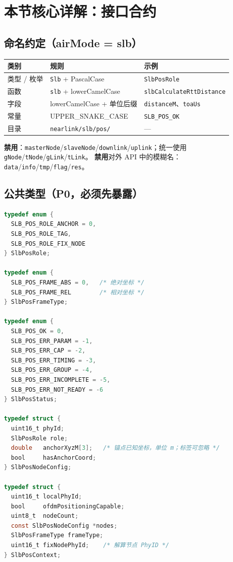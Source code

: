 \documentclass[11pt,a4paper]{ctexart}
\begin{document}
\section{本节核心详解：接口合约}

\subsection{命名约定（airMode = slb）}

\begin{table}[h]
\centering
\small
\begin{tabular}{lll}
\toprule
\textbf{类别} & \textbf{规则} & \textbf{示例} \\
\midrule
类型 / 枚举 & \texttt{Slb} + PascalCase & \texttt{SlbPosRole} \\
函数 & \texttt{slb} + lowerCamelCase & \texttt{slbCalculateRttDistance} \\
字段 & lowerCamelCase + 单位后缀 & \texttt{distanceM}、\texttt{toaUs} \\
常量 & UPPER\_SNAKE\_CASE & \texttt{SLB\_POS\_OK} \\
目录 & \texttt{nearlink/slb/pos/} & --- \\
\bottomrule
\end{tabular}
\end{table}

\textbf{禁用}：\texttt{masterNode}/\texttt{slaveNode}/\texttt{downlink}/\texttt{uplink}；统一使用 \texttt{gNode}/\texttt{tNode}/\texttt{gLink}/\texttt{tLink}。
\textbf{禁用}对外 API 中的模糊名：\texttt{data}/\texttt{info}/\texttt{tmp}/\texttt{flag}/\texttt{res}。

\subsection{公共类型（P0，必须先暴露）}

\begin{lstlisting}[language=C,caption={P0 公共类型（精简）}]
typedef enum {
  SLB_POS_ROLE_ANCHOR = 0,
  SLB_POS_ROLE_TAG,
  SLB_POS_ROLE_FIX_NODE
} SlbPosRole;

typedef enum {
  SLB_POS_FRAME_ABS = 0,   /* 绝对坐标 */
  SLB_POS_FRAME_REL        /* 相对坐标 */
} SlbPosFrameType;

typedef enum {
  SLB_POS_OK = 0,
  SLB_POS_ERR_PARAM = -1,
  SLB_POS_ERR_CAP = -2,
  SLB_POS_ERR_TIMING = -3,
  SLB_POS_ERR_GROUP = -4,
  SLB_POS_ERR_INCOMPLETE = -5,
  SLB_POS_ERR_NOT_READY = -6
} SlbPosStatus;

typedef struct {
  uint16_t phyId;
  SlbPosRole role;
  double   anchorXyzM[3];   /* 锚点已知坐标，单位 m；标签可忽略 */
  bool     hasAnchorCoord;
} SlbPosNodeConfig;

typedef struct {
  uint16_t localPhyId;
  bool     ofdmPositioningCapable;
  uint8_t  nodeCount;
  const SlbPosNodeConfig *nodes;
  SlbPosFrameType frameType;
  uint16_t fixNodePhyId;    /* 解算节点 PhyID */
} SlbPosContext;
\end{lstlisting}
\end{document}
